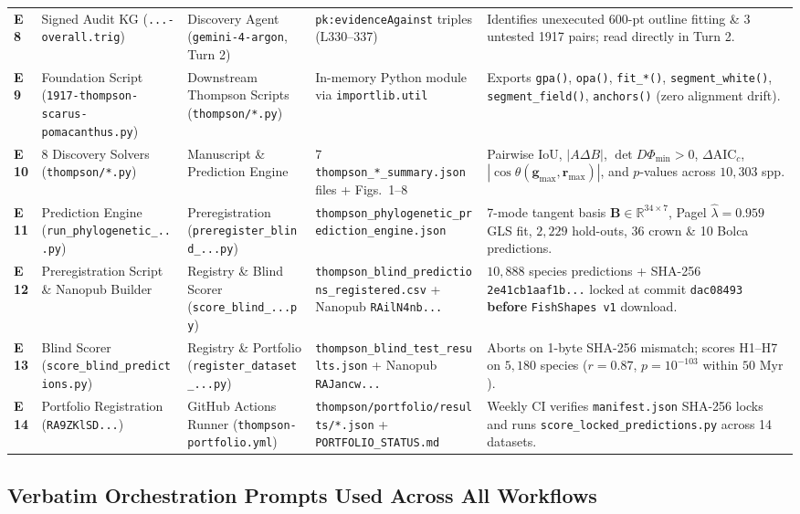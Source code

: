 \documentclass[10.5pt,a4paper]{article}
\newcommand{\code}[1]{{\footnotesize\nolinkurl{#1}}}
\begin{document}
{\begin{tabularx}{\textwidth}{L{0.28in} L{1.22in} L{1.22in} L{1.38in} Y}
\textbf{E8} & Signed Audit KG (\code{...-overall.trig}) & Discovery Agent (\code{gemini-4-argon}, Turn 2) & \texttt{pk:evidenceAgainst} triples (L330--337) & Identifies unexecuted 600-pt outline fitting \& 3 untested 1917 pairs; read directly in Turn 2. \\
\textbf{E9} & Foundation Script (\code{1917-thompson-scarus-pomacanthus.py}) & Downstream Thompson Scripts (\code{thompson/*.py}) & In-memory Python module via \code{importlib.util} & Exports \code{gpa()}, \code{opa()}, \code{fit_*()}, \code{segment_white()}, \code{segment_field()}, \code{anchors()} (zero alignment drift). \\
\textbf{E10} & 8 Discovery Solvers (\code{thompson/*.py}) & Manuscript \& Prediction Engine & 7 \code{thompson_*_summary.json} files + Figs.\ 1--8 & Pairwise $\mathrm{IoU}$, $|A\Delta B|$, $\det D\Phi_{\min} > 0$, $\Delta\mathrm{AIC}_c$, $|\cos\theta(\bm{g}_{\max},\bm{r}_{\max})|$, and $p$-values across $10{,}303$ spp. \\
\textbf{E11} & Prediction Engine (\code{run_phylogenetic_...py}) & Preregistration (\code{preregister_blind_...py}) & \code{thompson_phylogenetic_prediction_engine.json} & 7-mode tangent basis $\bm{B} \in \mathbb{R}^{34\times 7}$, Pagel $\hat{\lambda}=0.959$ GLS fit, $2{,}229$ hold-outs, 36 crown \& 10 Bolca predictions. \\
\textbf{E12} & Preregistration Script \& Nanopub Builder & Registry \& Blind Scorer (\code{score_blind_...py}) & \code{thompson_blind_predictions_registered.csv} + Nanopub \code{RAilN4nb...} & $10{,}888$ species predictions + SHA-256 \code{2e41cb1aaf1b...} locked at commit \texttt{dac08493} \textbf{before} \code{FishShapes v1} download. \\
\textbf{E13} & Blind Scorer (\code{score_blind_predictions.py}) & Registry \& Portfolio (\code{register_dataset_...py}) & \code{thompson_blind_test_results.json} + Nanopub \code{RAJancw...} & Aborts on 1-byte SHA-256 mismatch; scores H1--H7 on $5{,}180$ species ($r=0.87$, $p=10^{-103}$ within $50\text{ Myr}$). \\
\textbf{E14} & Portfolio Registration (\code{RA9ZKlSD...}) & GitHub Actions Runner (\code{thompson-portfolio.yml}) & \code{thompson/portfolio/results/*.json} + \code{PORTFOLIO_STATUS.md} & Weekly CI verifies \code{manifest.json} SHA-256 locks and runs \code{score_locked_predictions.py} across 14 datasets. \\
\bottomrule
\end{tabularx}
}

\subsection{Verbatim Orchestration Prompts Used Across All Workflows}
\end{document}
